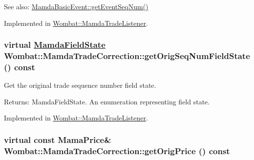 \begin{Desc}
\item[See also:]\hyperlink{classWombat_1_1MamdaBasicEvent_1fd845d48e95b4ee3beafc72d1ac2adf}{Mamda\-Basic\-Event::get\-Event\-Seq\-Num()} \end{Desc}


Implemented in \hyperlink{classWombat_1_1MamdaTradeListener_571a08fa4c669481abf0417a36064205}{Wombat::Mamda\-Trade\-Listener}.\hypertarget{classWombat_1_1MamdaTradeCorrection_7457f71235c7026bc40a3c2fced22c3f}{
\subsubsection[getOrigSeqNumFieldState]{\setlength{\rightskip}{0pt plus 5cm}virtual \hyperlink{namespaceWombat_93aac974f2ab713554fd12a1fa3b7d2a}{Mamda\-Field\-State} Wombat::Mamda\-Trade\-Correction::get\-Orig\-Seq\-Num\-Field\-State () const}}
\label{classWombat_1_1MamdaTradeCorrection_7457f71235c7026bc40a3c2fced22c3f}


Get the original trade sequence number field state. 

\begin{Desc}
\item[Returns:]Mamda\-Field\-State. An enumeration representing field state. \end{Desc}


Implemented in \hyperlink{classWombat_1_1MamdaTradeListener_0767574a3f0c34ae680fbbfadf296e0e}{Wombat::Mamda\-Trade\-Listener}.\hypertarget{classWombat_1_1MamdaTradeCorrection_d458a3b2957ac56a51c345ab02d3dd49}{
\subsubsection[getOrigPrice]{\setlength{\rightskip}{0pt plus 5cm}virtual const Mama\-Price\& Wombat::Mamda\-Trade\-Correction::get\-Orig\-Price () const}}
\label{classWombat_1_1MamdaTradeCorrection_d458a3b2957ac56a51c345ab02d3dd49}


